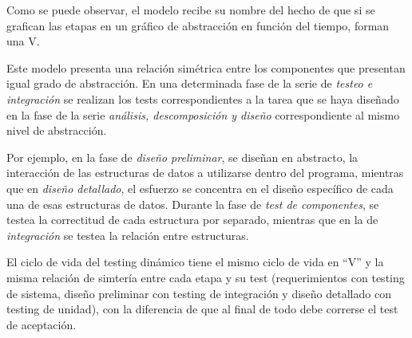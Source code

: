 \documentclass[]{article}
\begin{document}

Como se puede observar, el modelo recibe su nombre del hecho de que si se grafican las etapas en un gráfico de abstracción en función del tiempo, forman una V.

Este modelo presenta una relación simétrica entre los componentes que presentan igual grado de abstracción. En una determinada fase de la serie de \textit{testeo e integración} se realizan los tests correspondientes a la tarea que se haya diseñado en la fase de la serie \textit{análisis, descomposición y diseño} correspondiente al mismo nivel de abstracción.

Por ejemplo, en la fase de \textit{diseño preliminar}, se diseñan en abstracto, la interacción de las estructuras de datos a utilizarse dentro del programa, mientras que en \textit{diseño detallado}, el esfuerzo se concentra en el diseño específico de cada una de esas estructuras de datos. Durante la fase de \textit{test de componentes}, se testea la correctitud de cada estructura por separado, mientras que en la de \textit{integración} se testea la relación entre estructuras.

El ciclo de vida del testing dinámico tiene el mismo ciclo de vida en ``V'' y la misma relación de simtería entre cada etapa y su test (requerimientos con testing de sistema, diseño preliminar con testing de integración y diseño detallado con testing de unidad), con la diferencia de que al final de todo debe correrse el test de aceptación.
\end{document}
